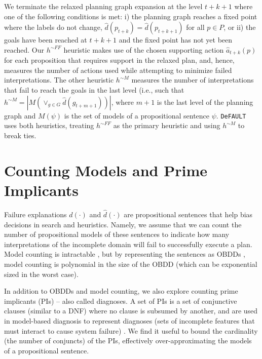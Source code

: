 \documentclass{article}
\def\citep#1{\cite{#1}}
\def\und#1{\noindent{\bf #1}:}
\def\FFRISKY{{\tt DeFAULT}}
\def\und#1{\medskip{\noindent\bf #1:}}
\begin{document}
\und{Heuristic Computation}   We terminate the relaxed planning graph expansion at the level $t+k+1$ where one of the following conditions is met: i) the planning graph reaches a fixed point where the
labels do not change, $\hat{d}(p_{t+k}) = \hat{d}(p_{t+k+1})$ for all $p\in P$, or ii) the goals have been reached at $t+k+1$ and the fixed point has not yet been reached. Our $h^{\sim FF}$ heuristic makes use of the chosen supporting action $\hat{a}_{t+k}(p)$ for each proposition that requires support in the relaxed plan, and, hence, measures the number of actions used while attempting to minimize failed interpretations.  The other heuristic
$h^{\sim M}$ measures the number of interpretations that fail to reach the goals in the last level (i.e., such that  $h^{\sim M} = |M(\vee_{g \in G} \hat{d}(g_{t+m+1}))|$, where $m+1$ is the last level of the planning graph and $M(\psi)$ is the set of models of a propositional sentence $\psi$.  \FFRISKY{} uses both heuristics, treating  $h^{\sim FF}$ as the primary heuristic and using $h^{\sim M}$ to break ties.

\section{Counting Models and Prime Implicants }

Failure explanations $d(\cdot)$ and $\hat{d}(\cdot)$ are propositional sentences that help bias decisions in search and heuristics.  Namely, we assume that we can count the number of propositional models of these sentences to indicate how many interpretations of the incomplete domain will fail to successfully execute a plan.  Model counting is intractable \citep{Roth96}, but by representing the sentences as OBDDs \citep{bryant-ieeetc86}, model counting is polynomial in the size of the OBDD \citep{darwiche} (which can be exponential sized in the worst case).  

In addition to OBDDs and model counting, we also explore counting prime implicants (PIs) -- also called diagnoses.  A set of PIs is a set of conjunctive clauses (similar to a DNF) where no clause is subsumed by another, and are used in model-based diagnosis to represent diagnoses (sets of incomplete features that must interact to cause system failure) \citep{dekleer, reiter}.  We find it useful to bound the cardinality (the number of conjuncts) of the PIs, effectively over-approximating the models of a propositional sentence.  
\end{document}
